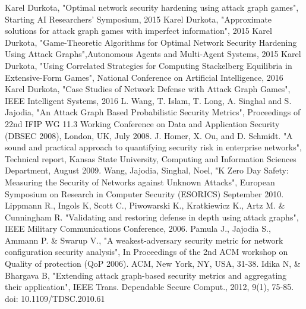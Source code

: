 \documentclass[12pt,a4paper]{article}
\begin{document}
\begin{thebibliography}{}
 Karel Durkota, "Optimal network security hardening using attack graph games", Starting AI Researchers' Symposium, 2015
 Karel Durkota, "Approximate solutions for attack graph games with imperfect information", 2015
 Karel Durkota, "Game-Theoretic Algorithms for Optimal Network Security Hardening Using Attack Graphs",Autonomous Agents and Multi-Agent Systems, 2015
 Karel Durkota, "Using Correlated Strategies for Computing Stackelberg Equilibria in Extensive-Form Games", National Conference on Artificial Intelligence, 2016
 Karel Durkota, "Case Studies of Network Defense with Attack Graph Games", IEEE Intelligent Systems, 2016
 L. Wang, T. Islam, T. Long, A. Singhal and S. Jajodia, "An Attack Graph Based Probabilistic Security Metrics", Proceedings of 22nd IFIP WG 11.3 Working Conference on Data and Application Security (DBSEC 2008), London, UK, July 2008.
 J. Homer, X. Ou, and D. Schmidt. "A sound and practical approach to quantifying security risk in enterprise networks", Technical report, Kansas State University, Computing and Information Sciences Department, August 2009.
 Wang, Jajodia, Singhal, Noel, "K Zero Day Safety: Measuring the Security of Networks against Unknown Attacks", European Symposium on Research in Computer Security (ESORICS) September 2010.
 Lippmann R., Ingols K, Scott C., Piwowarski K., Kratkiewicz K., Artz M. \& Cunningham R. "Validating and restoring defense in depth using attack graphs", IEEE Military Communications Conference, 2006.
 Pamula J., Jajodia S., Ammann P. \& Swarup V., "A weakest-adversary security metric for network configuration security analysis", In Proceedings of the 2nd
ACM workshop on Quality of protection (QoP 2006). ACM, New York, NY, USA, 31-38. 
 Idika N, \& Bhargava B, "Extending attack graph-based security metrics and aggregating their application", IEEE Trans. Dependable Secure Comput., 2012, 9(1), 75-85. doi: 10.1109/TDSC.2010.61

\end{thebibliography}
\end{document}
